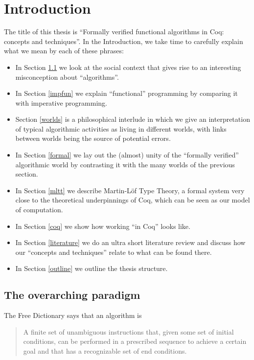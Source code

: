 \documentclass[declaration,mgr,english,shortabstract]{iithesis}
\author         {Wojciech Kołowski}
\date           {Kwiecień 2021} %
\begin{document}

\chapter{Introduction} \label{introduction}

The title of this thesis is ``Formally verified functional algorithms in Coq: concepts and techniques''. In the Introduction, we take time to carefully explain what we mean by each of these phrases:

\begin{itemize}
    \item In Section \ref{paradigm} we look at the social context that gives rise to an interesting misconception about ``algorithms''.
    \item In Section \ref{impfun} we explain ``functional'' programming by comparing it with imperative programming.
    \item Section \ref{worlds} is a philosophical interlude in which we give an interpretation of typical algorithmic activities as living in different worlds, with links between worlds being the source of potential errors.
    \item In Section \ref{formal} we lay out the (almost) unity of the ``formally verified'' algorithmic world by contrasting it with the many worlds of the previous section.
    \item In Section \ref{mltt} we describe Martin-L\"{o}f Type Theory, a formal system very close to the theoretical underpinnings of Coq, which can be seen as our model of computation.
    \item In Section \ref{coq} we show how working ``in Coq'' looks like.
    \item In Section \ref{literature} we do an ultra short literature review and discuss how our ``concepts and techniques'' relate to what can be found there.
    \item In Section \ref{outline} we outline the thesis structure.
\end{itemize}

\section{The overarching paradigm} \label{paradigm}

The Free Dictionary says \cite{TheFreeDictionary} that an algorithm is

\begin{quote}
    A finite set of unambiguous instructions that, given some set of initial conditions, can be performed in a prescribed sequence to achieve a certain goal and that has a recognizable set of end conditions.
\end{quote}
\end{document}
